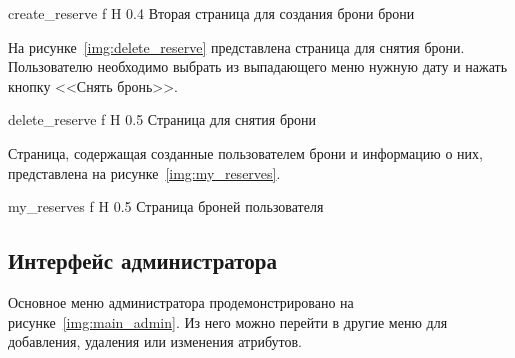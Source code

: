 

{create_reserve} %
{f} %
{H} %
{0.4\textwidth} %
{Вторая страница для создания брони брони} %


На рисунке~\ref{img:delete_reserve} представлена страница для снятия брони.
Пользователю необходимо выбрать из выпадающего меню нужную дату и нажать кнопку <<Снять бронь>>.


{delete_reserve} %
{f} %
{H} %
{0.5\textwidth} %
{Страница для снятия брони} %


Страница, содержащая созданные пользователем брони и информацию о них, представлена на рисунке~\ref{img:my_reserves}.
 


{my_reserves} %
{f} %
{H} %
{0.5\textwidth} %
{Страница броней пользователя} %


\subsection{Интерфейс администратора}
Основное меню администратора продемонстрировано на рисунке~\ref{img:main_admin}.
Из него можно перейти в другие меню для добавления, удаления или изменения атрибутов.

